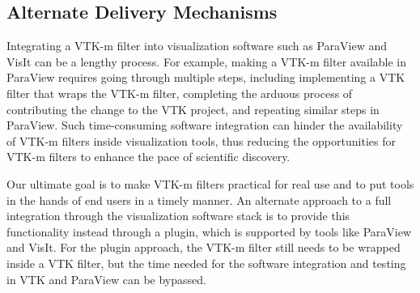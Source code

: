 
\subsection{Alternate Delivery Mechanisms}


Integrating a VTK-m filter into visualization software such as ParaView and VisIt can be a lengthy process. For example, making a VTK-m filter available in ParaView requires going through multiple steps, including implementing a VTK filter that wraps the VTK-m filter, completing the arduous process of contributing the change to the VTK project, and repeating similar steps in ParaView. Such time-consuming software integration can hinder the availability of VTK-m filters inside visualization tools, thus reducing the opportunities for VTK-m filters to enhance the pace of scientific discovery. 

Our ultimate goal is to make VTK-m filters practical for real use and to put tools in the hands of end users in a timely manner.
An alternate approach to a full integration through the visualization software stack is to provide this functionality instead through a plugin, which is supported by tools like ParaView and VisIt.
For the plugin approach, the VTK-m filter still needs to be wrapped inside a VTK filter, but the time needed for the software integration and testing in VTK and ParaView can be bypassed.       

